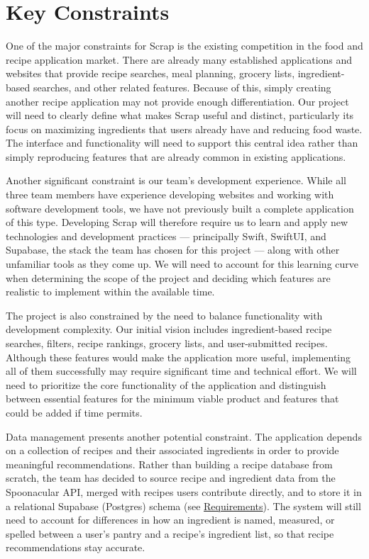 \chapter{Key Constraints}
One of the major constraints for Scrap is the existing competition in the food and recipe application market. There are already many established applications and websites that provide recipe searches, meal planning, grocery lists, ingredient-based searches, and other related features. Because of this, simply creating another recipe application may not provide enough differentiation. Our project will need to clearly define what makes Scrap useful and distinct, particularly its focus on maximizing ingredients that users already have and reducing food waste. The interface and functionality will need to support this central idea rather than simply reproducing features that are already common in existing applications.

Another significant constraint is our team's development experience. While all three team members have experience developing websites and working with software development tools, we have not previously built a complete application of this type. Developing Scrap will therefore require us to learn and apply new technologies and development practices --- principally Swift, SwiftUI, and Supabase, the stack the team has chosen for this project --- along with other unfamiliar tools as they come up. We will need to account for this learning curve when determining the scope of the project and deciding which features are realistic to implement within the available time.

The project is also constrained by the need to balance functionality with development complexity. Our initial vision includes ingredient-based recipe searches, filters, recipe rankings, grocery lists, and user-submitted recipes. Although these features would make the application more useful, implementing all of them successfully may require significant time and technical effort. We will need to prioritize the core functionality of the application and distinguish between essential features for the minimum viable product and features that could be added if time permits.

Data management presents another potential constraint. The application depends on a collection of recipes and their associated ingredients in order to provide meaningful recommendations. Rather than building a recipe database from scratch, the team has decided to source recipe and ingredient data from the Spoonacular API, merged with recipes users contribute directly, and to store it in a relational Supabase (Postgres) schema (see \hyperref[Chapter:Requirements]{Requirements}). The system will still need to account for differences in how an ingredient is named, measured, or spelled between a user's pantry and a recipe's ingredient list, so that recipe recommendations stay accurate.

